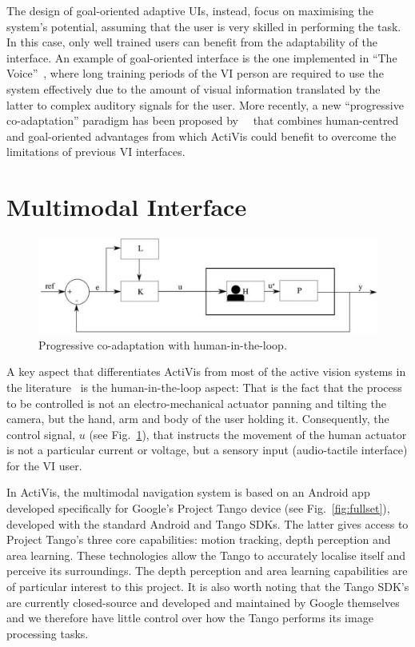 \documentclass[letterpaper]{article}
\begin{document}
The design of goal-oriented adaptive UIs, instead, focus on maximising the system's potential, assuming that the user is very skilled in performing the task. In this case, only well trained users can benefit from the adaptability of the interface. An example of goal-oriented interface is the one implemented in ``The Voice''~\cite{meijer2010}, where long training periods of the VI person are required to use the system effectively due to the amount of visual information translated by the latter to complex auditory signals for the user. More recently, a new ``progressive co-adaptation'' paradigm has been proposed by~\citeauthor{gallina2015}~\cite{gallina2015} that combines human-centred and goal-oriented advantages from which ActiVis could benefit to overcome the limitations of previous VI interfaces.

\section{Multimodal Interface}\label{sec:multimodal}

\begin{figure}
  \centering
  \includegraphics[width=0.8\columnwidth]{figures/loop.jpg}
  \caption{Progressive co-adaptation with human-in-the-loop.\label{fig:loop}}
\end{figure}

A key aspect that differentiates ActiVis from most of the active vision systems in the literature~\cite{Rivlin2000} is the human-in-the-loop aspect: That is the fact that the process to be controlled is not an electro-mechanical actuator panning and tilting the camera, but the hand, arm and body of the user holding it. Consequently, the control signal, $u$ (see Fig.~\ref{fig:loop}), that instructs the movement of the human actuator is not a particular current or voltage, but a sensory input (audio-tactile interface) for the VI user. 

In ActiVis, the multimodal navigation system is based on an Android app developed specifically for Google's Project Tango device (see Fig.~\ref{fig:fullset}), developed with the standard Android and Tango SDKs. The latter gives access to Project Tango's three core capabilities: motion tracking, depth perception and area learning. These technologies allow the Tango to accurately localise itself and perceive its surroundings. The depth perception and area learning capabilities are of particular interest to this project. It is also worth noting that the Tango SDK's are currently closed-source and developed and maintained by Google themselves and we therefore have little control over how the Tango performs its image processing tasks. 
\end{document}
